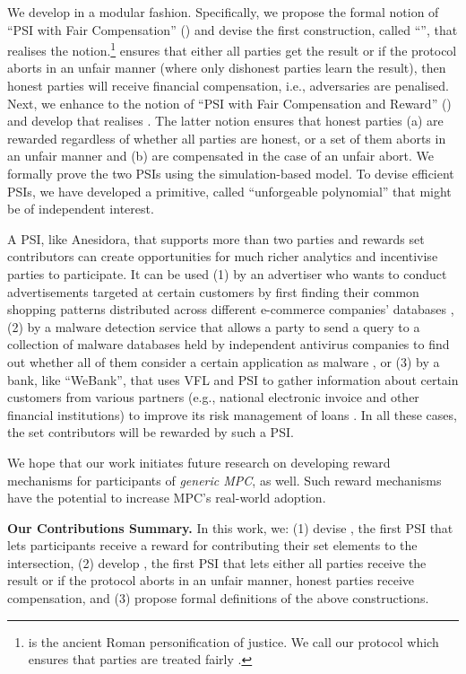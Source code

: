We develop \withRew in a modular fashion. Specifically, we propose the formal notion of ``PSI with Fair Compensation'' (\p) and devise the first construction, called ``\withFai'', that realises the notion.\footnote{\withFai is the ancient Roman personification of justice. We call our protocol which ensures that parties are treated fairly \withFai.} \p ensures that either all parties get the result or if the protocol aborts in an unfair manner (where only dishonest parties learn the result), then honest parties will receive financial compensation, i.e., adversaries are penalised. Next, we enhance \p to the notion of ``PSI with Fair Compensation and Reward'' (\ep) and develop \withRew that realises \ep. The latter notion ensures that honest parties (a) are rewarded regardless of whether all parties are honest, or a set of them aborts in an unfair manner and (b) are compensated in the case of an unfair abort. We formally prove the two PSIs using the simulation-based model. To devise efficient PSIs, we have developed a primitive, called ``unforgeable polynomial'' that might be of independent interest. 

A PSI, like Anesidora, that supports more than two parties and rewards set contributors can create opportunities for much richer analytics and incentivise parties to participate. It can be used (1) by an advertiser who wants to conduct advertisements targeted at certain customers by first finding their common shopping patterns distributed across different e-commerce companies' databases \cite{IonKNPSS0SY20}, (2) by a malware detection service that allows a party to send a query to a collection of malware databases held by independent antivirus companies to find out whether all of them consider a certain application as malware \cite{TamrakarLPEPA17}, or (3) by a bank, like ``WeBank'', that uses VFL and PSI to gather information about certain customers from various partners (e.g., national electronic invoice and other financial institutions) to improve its risk management of loans \cite{ChengLCY20}. In all these cases, the set contributors will be rewarded by such a PSI. 



We hope that our work initiates future research on developing reward mechanisms for participants of \emph{generic MPC}, as well. Such reward mechanisms have the potential to increase MPC's real-world adoption.  

\begin{paragraph}
%
{\textbf{Our Contributions Summary.}} In this work, we: (1) devise \withRew, the first PSI that lets participants receive a reward for contributing their set elements to the intersection, (2) develop \withFai, the first PSI that lets either all parties receive the result or if the protocol aborts in an unfair manner,  honest parties receive compensation, and (3) propose formal definitions of the above constructions.
%
\end{paragraph}



